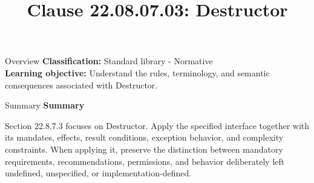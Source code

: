 \documentclass[10pt,letterpaper]{article}
\title{Clause 22.08.07.03: Destructor}
\author{}
\date{}
\begin{document}
\maketitle
\begin{CornellOverviewBox}{Overview}
\textbf{Classification:} Standard library - Normative\\[2pt]
\textbf{Learning objective:} Understand the rules, terminology, and semantic consequences associated with Destructor.
\end{CornellOverviewBox}\begin{CornellSummaryBox}{Summary}
{\sffamily\bfseries\color{Accent} Summary}\par\vspace{3pt}Section 22.8.7.3 focuses on Destructor. Apply the specified interface together with its mandates, effects, result conditions, exception behavior, and complexity constraints. When applying it, preserve the distinction between mandatory requirements, recommendations, permissions, and behavior deliberately left undefined, unspecified, or implementation-defined.
\end{CornellSummaryBox}
\end{document}
